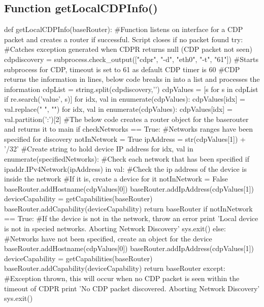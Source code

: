 \documentclass[11pt]{report}
\begin{document}



\begin{appendices}

\chapter{Function getLocalCDPInfo()}
\begin{python}
def getLocalCDPInfo(baseRouter):
	#Function listens on interface for a CDP packet and creates a router if successful. Script closes if no packet found
	try: #Catches exception generated when CDPR returns null (CDP packet not seen)
		cdpdiscovery = subprocess.check_output(["cdpr", "-d", "eth0", "-t", "61"])
		#Starts subprocess for CDP, timeout is set to 61 as default CDP timer is 60
		#CDP returns the information in lines, below code breaks in into a list and processes the information 
		cdpList = string.split(cdpdiscovery,'\n')
		cdpValues = [s for s in cdpList if re.search('value', s)]
		for idx, val in enumerate(cdpValues):
			cdpValues[idx] = val.replace(" ", "")
		for idx, val in enumerate(cdpValues):
			cdpValues[idx] = val.partition(':')[2]
		#The below code creates a router object for the baserouter and returns it to main
		if checkNetworks == True:
			#Networks ranges have been specified for discovery
			notInNetwork = True
			ipAddress = str(cdpValues[1]) + '/32'
			#Create string to hold device IP address
			for idx, val in enumerate(specifiedNetworks):
				#Check each network that has been specified
				if ipaddr.IPv4Network(ipAddress) in val:
					#Check the ip address of the device is inside the network
					#If it is, create a device for it
					notInNetwork = False
					baseRouter.addHostname(cdpValues[0])
					baseRouter.addIpAddress(cdpValues[1])
					deviceCapability = getCapabilities(baseRouter)
					baseRouter.addCapability(deviceCapability)
					return baseRouter
			if notInNetwork == True:
				#If the device is not in the network, throw an error
				print 'Local device is not in specied networks. Aborting Network Discovery'
				sys.exit()
		else:
		#Networks have not been specified, create an object for the device
		baseRouter.addHostname(cdpValues[0])
		baseRouter.addIpAddress(cdpValues[1])
		deviceCapability = getCapabilities(baseRouter)
		baseRouter.addCapability(deviceCapability)
		return baseRouter
	except:
		#Exception thrown, this will occur when no CDP packet is seen within the timeout of CDPR
		print 'No CDP packet discovered. Aborting Network Discovery'
		sys.exit()
\end{python}	


\end{appendices}
\end{document}
